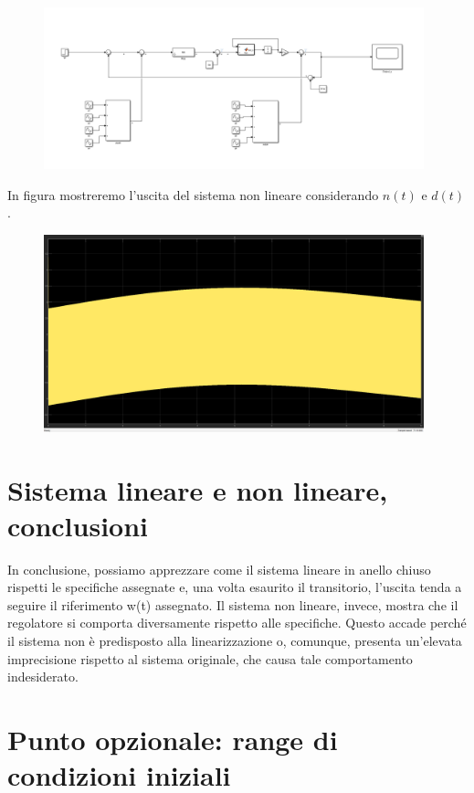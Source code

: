 \documentclass[a4paper, 11pt]{article}
\begin{document}
\begin{figure}[H]
    \centering
\includegraphics[width=110mm]{figs/simulink.PNG}
    \caption{}
    \label{Figura9}
\end{figure}

In figura mostreremo l'uscita del sistema non lineare considerando $n(t)$ e $d(t)$.
\begin{figure}[H]
    \centering
\includegraphics[width=110mm]{figs/nonLineare.PNG}
    \caption{}
    \label{Figura10}
\end{figure}
\section{Sistema lineare e non lineare, conclusioni}

In conclusione, possiamo apprezzare come il sistema lineare in anello chiuso rispetti le specifiche assegnate e, una volta esaurito il transitorio, l'uscita tenda a seguire il riferimento w(t) assegnato. Il sistema non lineare, invece, mostra che il regolatore si comporta diversamente rispetto alle specifiche. Questo accade perché il sistema non è predisposto alla linearizzazione o, comunque, presenta un'elevata imprecisione rispetto al sistema originale, che causa tale comportamento indesiderato.

\section{Punto opzionale: range di condizioni iniziali}
\end{document}

